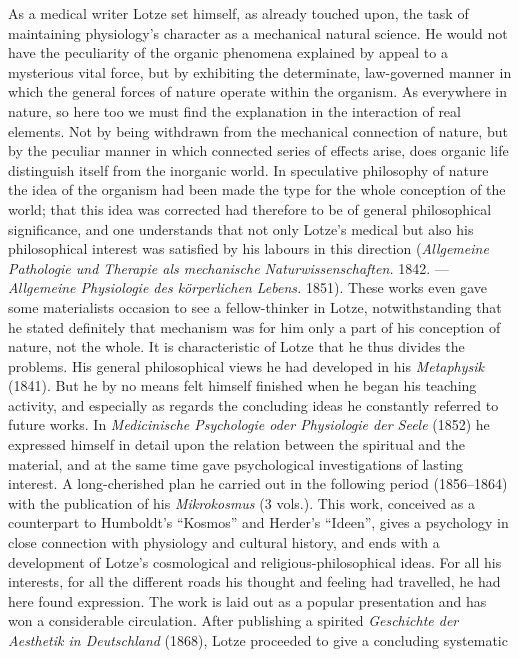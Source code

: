 \documentclass[12pt,a4paper]{book}
\newcommand{\opage}[1]{\marginnote{\footnotesize\textit{[#1]}}}
\begin{document}
As a medical writer Lotze set himself, as already touched upon, the task of
maintaining physiology's character as a mechanical natural science. He would not
have the peculiarity of the organic phenomena explained by appeal to a
mysterious vital force, but by exhibiting the determinate, law-governed manner
in which the general forces of nature operate within the organism. As everywhere
in nature, so here too we must find the explanation in the interaction of real
elements. Not by being withdrawn from the mechanical connection of nature, but
by the peculiar manner in which connected series of effects arise, does organic
life distinguish itself from the inorganic world. In speculative philosophy of
nature the idea of the organism had been made the type for the whole conception
of the world; \opage{512}that this idea was corrected had therefore to be of general
philosophical significance, and one understands that not only Lotze's medical
but also his philosophical interest was satisfied by his labours in this
direction (\textit{Allgemeine Pathologie und Therapie als mechanische
Naturwissenschaften.} 1842. --- \textit{Allgemeine Physiologie des körperlichen
Lebens.} 1851). These works even gave some materialists occasion to see a
fellow-thinker in Lotze, notwithstanding that he stated definitely that
mechanism was for him only a part of his conception of nature, not the whole. It
is characteristic of Lotze that he thus divides the problems. His general
philosophical views he had developed in his \textit{Metaphysik} (1841). But he
by no means felt himself finished when he began his teaching activity, and
especially as regards the concluding ideas he constantly referred to future
works. In \textit{Medicinische Psychologie oder Physiologie der Seele} (1852) he
expressed himself in detail upon the relation between the spiritual and the
material, and at the same time gave psychological investigations of lasting
interest. A long-cherished plan he carried out in the following period
(1856--1864) with the publication of his \textit{Mikrokosmus} (3 vols.). This
work, conceived as a counterpart to Humboldt's ``Kosmos'' and Herder's
``Ideen'', gives a psychology in close connection with physiology and cultural
history, and ends with a development of Lotze's cosmological and
religious-philosophical ideas. For all his interests, for all the different
roads his thought and feeling had travelled, he had here found expression. The
work is laid out as a popular presentation and has won a considerable
circulation. After publishing a spirited \textit{Geschichte der Aesthetik in
Deutschland} (1868), Lotze proceeded to give a concluding systematic
\end{document}
